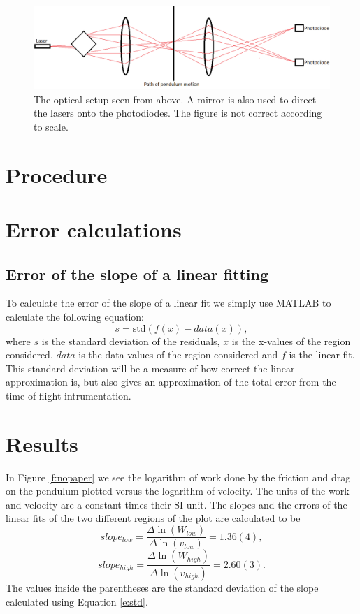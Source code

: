 \documentclass[11pt, a4paper]{article}
\begin{document}
\begin{figure}[h]
	\centering
	\includegraphics[scale=0.4]{opticalsetup2}
	\caption{The optical setup seen from above. A mirror is also used to direct the lasers onto the photodiodes. The figure is not correct according to scale.}
	\label{f:opticalsetup}
\end{figure}

\section{Procedure}

\section{Error calculations}

\subsection{Error of the slope of a linear fitting}
To calculate the error of the slope of a linear fit we simply use MATLAB to calculate the following equation:
\begin{equation}
	s = \text{std}(f(x)-data(x)),
	\label{e:std}
\end{equation}
where $s$ is the standard deviation of the residuals, $x$ is the x-values of the region considered, 
$data$ is the data values of the region considered and $f$ is the linear fit.
This standard deviation will be a measure of how correct the linear approximation is, 
but also gives an approximation of the total error from the time of flight intrumentation.

\section{Results}
In Figure \ref{f:nopaper} we see the logarithm of work done by the friction and 
drag on the pendulum plotted versus the logarithm of velocity. 
The units of the work and velocity are a constant times their SI-unit. 
The slopes and the errors of the linear fits of the two different regions of the plot are calculated to be
\[
	slope_{low}=\frac{\Delta\ln(W_{low})}{\Delta\ln(v_{low})} = 1.36(4),
\]\[
	slope_{high}=\frac{\Delta\ln(W_{high})}{\Delta\ln(v_{high})} = 2.60(3).
\]
The values inside the parentheses are the standard deviation of the slope calculated using Equation \ref{e:std}.
\end{document}
